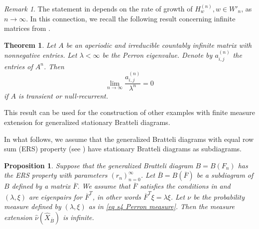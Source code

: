 \documentclass[11pt,reqno]{amsart}
\theoremstyle{definition}
\theoremstyle{remark}
\newtheorem{remark}[definition]{Remark}
\theoremstyle{plain}
\newtheorem*{theorem*}{Theorem}
\newtheorem{prop}[definition]{Proposition}
\def\ol{\overline}
\def\wh{\widehat}
\numberwithin{equation}{section}
\begin{document}
\begin{remark}
The statement in  depends on the rate of growth of $H^{(n)}_w, w \in W'_n$, as $n \to \infty$. In this connection, we recall the following result concerning infinite matrices from \cite{Kitchens1998}. 

\begin{theorem*}\cite[Theorem 7.1.3 $(f)$ and Lemma 7.1.19]{Kitchens1998} Let $A$ be an aperiodic and irreducible countably infinite matrix with nonnegative entries. Let $\lambda <\infty$ be the Perron eigenvalue. 
Denote by $a^{(n)}_{i,j}$ the entries of $A^n$.
Then 
$$
\lim_{n\to \infty} \dfrac{a^{(n)}_{i,j}}{\lambda^n} =0
$$ if $A$ is transient or null-recurrent.
\end{theorem*} 

This result can be used for the construction of other examples with 
finite measure extension for generalized stationary Bratteli diagrams. 

\end{remark}


In what follows, we assume that the generalized Bratteli diagrams with equal row sum (ERS) property (see ) have stationary Bratteli diagrams as subdiagrams. 

\begin{prop}\label{prop s4 stat diagr ext}
Suppose that the generalized Bratteli diagram $B= B(F_n)$ has the ERS property with parameters $(r_n)_{n=0}^{\infty}$. Let $\ol B = B (\ol F)$ be a subdiagram of $B$ defined by a matrix $\ol F$. We assume that $\ol F$ satisfies the conditions in  and $(\lambda,\xi)$ are \textit{eigenpairs} for $\ol{F}^T $, in other words $\ol{F}^T \xi = \lambda \xi$. Let $\nu $ be the probability measure defined by $(\lambda, \xi) $ as in \eqref{eq s4 Perron measure}. Then the measure extension $\wh\nu(\wh X_{\ol B}) $ is infinite. 
\end{prop}
\end{document}
